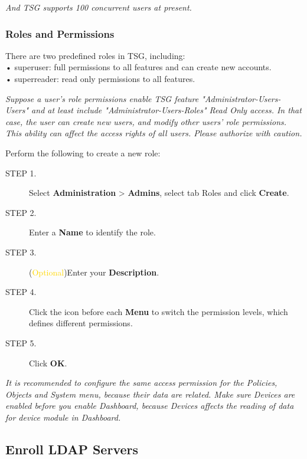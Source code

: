 \notemark\textit{And TSG supports 100 concurrent users at present.}

\subsubsection*{\hypertarget{link:Roles and Permissions}{Roles and Permissions}}
\label{sec:intro:admin:users:permission}

There are two predefined roles in TSG, including:\\
• superuser: full permissions to all features and can create new accounts.\\
• superreader: read only permissions to all features. 


\notemark\textit{Suppose a user’s role permissions enable TSG feature "Administrator-Users-Users" and at least include "Administrator-Users-Roles" Read Only access. In that case, 
the user can create new users, and modify other users’ role permissions. This ability can affect the access rights of all users. Please authorize with caution.}


Perform the following to create a new role:


\begin{description}
    \item[STEP 1.] Select \textbf{Administration} > \textbf{Admins}, select tab Roles and click \textbf{Create}.
    \item[STEP 2.] Enter a \textbf{Name} to identify the role.
    \item[STEP 3.] (\textcolor{gold}{Optional})Enter your \textbf{Description}.
    \item[STEP 4.]	Click the icon before each \textbf{Menu} to switch the permission levels, which defines different permissions.
    \item[STEP 5.]	Click \textbf{OK}.
\end{description}


\notemark\textit{It is recommended to configure the same access permission for the Policies, Objects and System menu, because their data are related. 
Make sure Devices are enabled before you enable Dashboard, because Devices affects the reading of data for device module in Dashboard.}


\subsection*{\hypertarget{link:Enroll LDAP Servers}{Enroll LDAP Servers}}
\label{sec:intro:admin:ldap}


